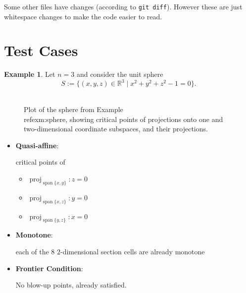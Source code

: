 \documentclass[
]{book}
\providecommand{\tightlist}{%
  \setlength{\itemsep}{0pt}\setlength{\parskip}{0pt}}
\theoremstyle{definition}
\theoremstyle{definition}
\newtheorem{example}{Example}[chapter]
\theoremstyle{definition}
\theoremstyle{definition}
\theoremstyle{remark}
\begin{document}
Some other files have changes (according to \texttt{git\ diff}). However these are just whitespace changes to make the code easier to read.

\hypertarget{test-cases-1}{%
\section{Test Cases}\label{test-cases-1}}

\begin{example}
\protect\hypertarget{exm:sphere}{}\label{exm:sphere}Let \(n = 3\) and consider the unit sphere
\[
S := \{ (x,y,z) \in \mathbb{R}^3 \mid x^2 + y^2 + z^2 - 1 = 0 \}.
\]
\end{example}

\begin{figure}

{\centering \includegraphics[width=0.6\linewidth]{gnuplot/sphere} 

}

\caption{Plot of the sphere from Example \\ref{exm:sphere}, showing critical points of projections onto one and two-dimensional coordinate subspaces, and their projections.}\label{fig:unnamed-chunk-2}
\end{figure}

\begin{itemize}
\item
  \textbf{Quasi-affine}:

  critical points of

  \begin{itemize}
  \tightlist
  \item
    \({\operatorname{proj}_{{\operatorname{span} \{x,y\}}}}: z = 0\)
  \item
    \({\operatorname{proj}_{{\operatorname{span} \{x,z\}}}}: y = 0\)
  \item
    \({\operatorname{proj}_{{\operatorname{span} \{y,z\}}}}: x = 0\)
  \end{itemize}
\item
  \textbf{Monotone}:

  each of the 8 \(2\)-dimensional section cells are already monotone
\item
  \textbf{Frontier Condition}:

  No blow-up points, already satisfied.
\end{itemize}
\end{document}

